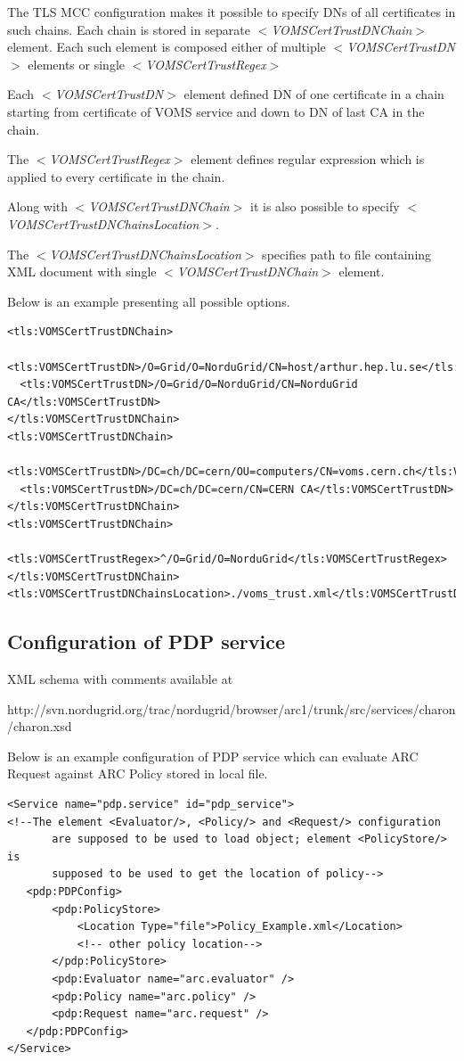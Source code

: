\documentclass{article}                            %
\begin{document}
The TLS MCC configuration makes it possible to specify DNs of all certificates in such chains. Each chain is stored in separate \textit{$<$VOMSCertTrustDNChain$>$} element. Each such element is composed either of multiple \textit{$<$VOMSCertTrustDN$>$} elements or single \textit{$<$VOMSCertTrustRegex$>$}

Each \textit{$<$VOMSCertTrustDN$>$} element defined DN of one certificate in a chain starting from certificate of VOMS service and down to DN of last CA in the chain.

The \textit{$<$VOMSCertTrustRegex$>$} element defines regular expression which is applied to every certificate in the chain.

Along with \textit{$<$VOMSCertTrustDNChain$>$} it is also possible to specify \textit{$<$VOMSCertTrustDNChainsLocation$>$}.

The \textit{$<$VOMSCertTrustDNChainsLocation$>$} specifies path to file containing XML document with single \textit{$<$VOMSCertTrustDNChain$>$} element.

Below is an example presenting all possible options.

\begin{verbatim}
<tls:VOMSCertTrustDNChain>
  <tls:VOMSCertTrustDN>/O=Grid/O=NorduGrid/CN=host/arthur.hep.lu.se</tls:VOMSCertTrustDN>
  <tls:VOMSCertTrustDN>/O=Grid/O=NorduGrid/CN=NorduGrid CA</tls:VOMSCertTrustDN>
</tls:VOMSCertTrustDNChain>
<tls:VOMSCertTrustDNChain>
  <tls:VOMSCertTrustDN>/DC=ch/DC=cern/OU=computers/CN=voms.cern.ch</tls:VOMSCertTrustDN>
  <tls:VOMSCertTrustDN>/DC=ch/DC=cern/CN=CERN CA</tls:VOMSCertTrustDN>
</tls:VOMSCertTrustDNChain>
<tls:VOMSCertTrustDNChain>
  <tls:VOMSCertTrustRegex>^/O=Grid/O=NorduGrid</tls:VOMSCertTrustRegex>
</tls:VOMSCertTrustDNChain>
<tls:VOMSCertTrustDNChainsLocation>./voms_trust.xml</tls:VOMSCertTrustDNChainsLocation>
\end{verbatim}


\subsection{Configuration of PDP service} %
\label{subsec:pdpservice_conf}
XML schema with comments available at

http://svn.nordugrid.org/trac/nordugrid/browser/arc1/trunk/src/services/charon/charon.xsd

Below is an example configuration of PDP service which can evaluate ARC Request against ARC Policy stored in local file.

\begin{verbatim}
<Service name="pdp.service" id="pdp_service">
<!--The element <Evaluator/>, <Policy/> and <Request/> configuration
       are supposed to be used to load object; element <PolicyStore/> is
       supposed to be used to get the location of policy-->
   <pdp:PDPConfig>
       <pdp:PolicyStore>
           <Location Type="file">Policy_Example.xml</Location>
           <!-- other policy location-->
       </pdp:PolicyStore>
       <pdp:Evaluator name="arc.evaluator" />
       <pdp:Policy name="arc.policy" />
       <pdp:Request name="arc.request" />
   </pdp:PDPConfig>
</Service>
\end{verbatim}
\end{document}

